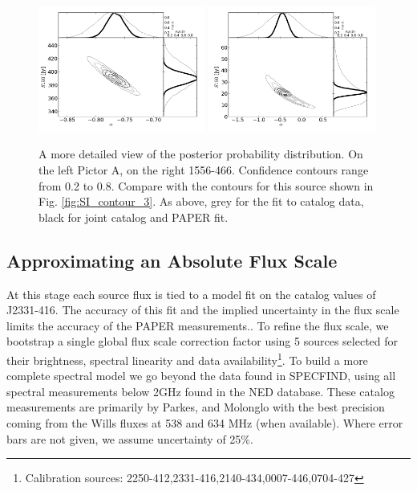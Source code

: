 \documentclass[preprint]{aastex}
\begin{document}
\begin{figure}[htbp]
\includegraphics[width=0.49\textwidth]{plots/pic_trace_hist.png}
\includegraphics[width=0.49\textwidth]{plots/1556-466_trace_hist.png}
\caption{
A more detailed view of the posterior probability distribution. On the left
Pictor A, on the right 1556-466. Confidence contours range from 0.2 to 0.8.
Compare with the contours for this source shown in Fig. \ref{fig:SI_contour_3}.
As above, grey for  the fit to catalog data, black for joint catalog and PAPER
fit.
}
\end{figure}

\subsection{Approximating an Absolute Flux Scale}
\label{sec:flux_scale}

At this stage each source flux is tied to a model fit on the catalog values of
J2331-416. The accuracy of this fit and the implied uncertainty in the flux
scale limits the accuracy of the PAPER measurements..  To refine the flux
scale, we bootstrap a single global flux scale correction factor using 5
sources selected for their brightness, spectral linearity and data
availability\footnote{Calibration sources:
2250-412,2331-416,2140-434,0007-446,0704-427}. To build a more complete
spectral model we go beyond the data found in SPECFIND, using all spectral
measurements below 2GHz found in the NED database.  These catalog measurements
are primarily by Parkes, and Molonglo with the best precision coming from the
Wills fluxes at 538 and 634 MHz (when available). Where error bars are not
given, we assume uncertainty of 25\%. 
\end{document}
